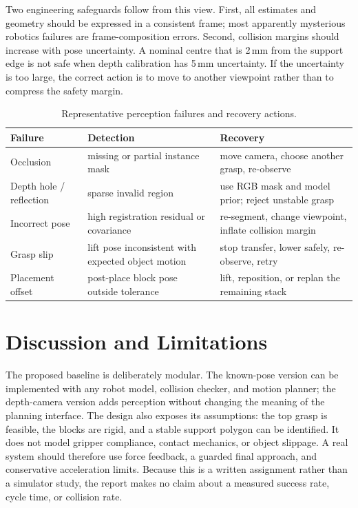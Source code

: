 \documentclass{article}
\begin{document}
Two engineering safeguards follow from this view. First, all estimates and
geometry should be expressed in a consistent frame; most apparently mysterious
robotics failures are frame-composition errors. Second, collision margins should
increase with pose uncertainty. A nominal centre that is 2\,mm from the support
edge is not safe when depth calibration has 5\,mm uncertainty. If the uncertainty
is too large, the correct action is to move to another viewpoint rather than to
compress the safety margin.

\begin{table}[t]
\caption{Representative perception failures and recovery actions.}
\label{tab:failure}
\centering
\small
\begin{tabularx}{\linewidth}{@{}lXX@{}}
\toprule
Failure & Detection & Recovery \\
\midrule
Occlusion & missing or partial instance mask &
move camera, choose another grasp, re-observe \\
Depth hole / reflection & sparse invalid region &
use RGB mask and model prior; reject unstable grasp \\
Incorrect pose & high registration residual or covariance &
re-segment, change viewpoint, inflate collision margin \\
Grasp slip & lift pose inconsistent with expected object motion &
stop transfer, lower safely, re-observe, retry \\
Placement offset & post-place block pose outside tolerance &
lift, reposition, or replan the remaining stack \\
\bottomrule
\end{tabularx}
\end{table}

\section{Discussion and Limitations}\label{sec:discussion}

The proposed baseline is deliberately modular. The known-pose version can be
implemented with any robot model, collision checker, and motion planner; the
depth-camera version adds perception without changing the meaning of the
planning interface. The design also exposes its assumptions: the top grasp is
feasible, the blocks are rigid, and a stable support polygon can be identified.
It does not model gripper compliance, contact mechanics, or object slippage. A
real system should therefore use force feedback, a guarded final approach, and
conservative acceleration limits. Because this is a written assignment rather
than a simulator study, the report makes no claim about a measured success rate,
cycle time, or collision rate.
\end{document}
